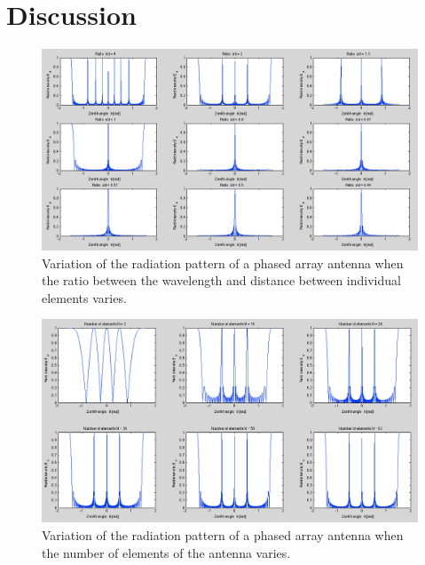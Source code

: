 \documentclass{article}
\begin{document}

\section{Discussion}
\begin{figure}[tbh]
\centering
\includegraphics[width=\textwidth]{Figures/ratio.png}
\caption{Variation of the radiation pattern of a phased array antenna when the ratio between the wavelength and distance between individual elements varies.}
\label{fig:ratio}
\end{figure}

\begin{figure}[tbh]
\centering
\includegraphics[width=\textwidth]{Figures/elements.png}
\caption{Variation of the radiation pattern of a phased array antenna when the number of elements of the antenna varies.}
\label{fig:elements}
\end{figure}

\newpage
\end{document}
